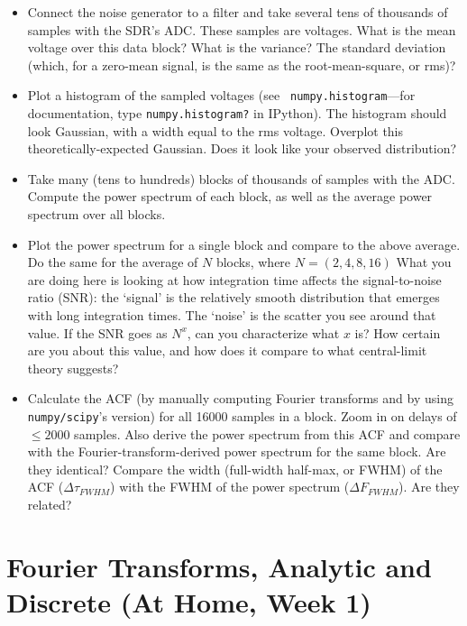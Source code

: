 \documentclass[11pt,preprint]{aastex}
\begin{document}
\begin{itemize}

\item Connect the noise generator to a 
  filter and take several tens of thousands of samples
  with the SDR's ADC.
  These samples are voltages. What is the
  mean voltage over this data block?
  What is the variance? The standard deviation (which, for a zero-mean signal,
  is the same as the root-mean-square, or rms)?

\item Plot a histogram of the sampled voltages (see {\tt
  numpy.histogram}---for documentation, type {\tt numpy.histogram?} in IPython).
  The histogram
  should look Gaussian, with a width equal to the rms
  voltage. Overplot this theoretically-expected Gaussian. Does it look
  like your observed distribution?

\item Take many (tens to hundreds) blocks of thousands of samples with the ADC. 
  Compute the power spectrum
  of each block, as well as the average power spectrum over all blocks.

\item Plot the power spectrum for a single block and compare to the
  above average. Do the same for the average of $N$ blocks, where $N=(2,
  4, 8, 16)$ What you are doing here is looking at how integration time
  affects the signal-to-noise ratio (SNR): the `signal' is the relatively
  smooth distribution that emerges with long integration times.
  The `noise' is the scatter you see around that value. If the SNR goes as
  $N^x$, can you characterize what $x$ is? How certain are you about this value, and
  how does it compare to what central-limit theory suggests?

\item Calculate the ACF (by manually computing Fourier transforms and by using \verb$numpy/scipy$'s version)
  for all
  16000 samples in a block. Zoom in on delays of $\le 2000$ samples. Also derive the power
  spectrum from this ACF and compare with the Fourier-transform-derived power
  spectrum for the same block.  Are they identical?
  Compare the width (full-width half-max, or FWHM) of the ACF ($\Delta
  \tau_{FWHM}$) with the FWHM of the power spectrum ($\Delta
  F_{FWHM}$). Are they related?

\end{itemize}

\section{Fourier Transforms, Analytic and Discrete (At Home, Week 1)} 
\label{pwrspectrum}
 
\end{document}
